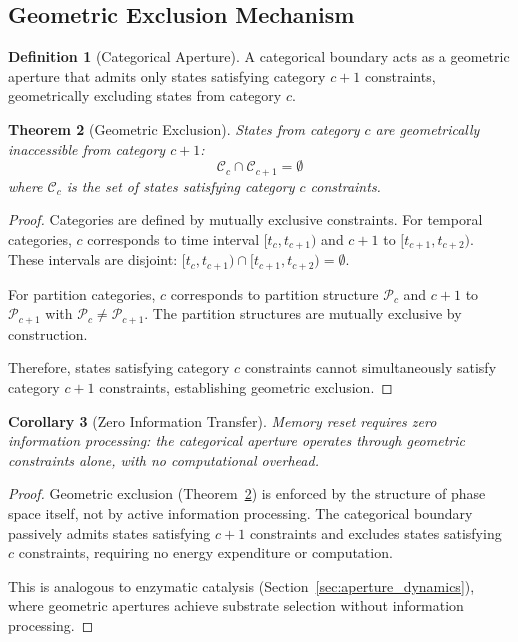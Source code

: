 \documentclass[11pt,twocolumn,a4paper]{article}
\newtheorem{theorem}{Theorem}[section]
\newtheorem{corollary}[theorem]{Corollary}
\theoremstyle{definition}
\newtheorem{definition}[theorem]{Definition}
\theoremstyle{remark}
\begin{document}
\subsection{Geometric Exclusion Mechanism}

\begin{definition}[Categorical Aperture]
\label{def:categorical_aperture}
A categorical boundary acts as a geometric aperture that admits only states satisfying category $c+1$ constraints, geometrically excluding states from category $c$.
\end{definition}

\begin{theorem}[Geometric Exclusion]
\label{thm:geometric_exclusion}
States from category $c$ are geometrically inaccessible from category $c+1$:
\begin{equation}
\mathcal{C}_c \cap \mathcal{C}_{c+1} = \emptyset
\label{eq:geometric_exclusion}
\end{equation}
where $\mathcal{C}_c$ is the set of states satisfying category $c$ constraints.
\end{theorem}

\begin{proof}
Categories are defined by mutually exclusive constraints. For temporal categories, $c$ corresponds to time interval $[t_c, t_{c+1})$ and $c+1$ to $[t_{c+1}, t_{c+2})$. These intervals are disjoint: $[t_c, t_{c+1}) \cap [t_{c+1}, t_{c+2}) = \emptyset$.

For partition categories, $c$ corresponds to partition structure $\mathcal{P}_c$ and $c+1$ to $\mathcal{P}_{c+1}$ with $\mathcal{P}_c \neq \mathcal{P}_{c+1}$. The partition structures are mutually exclusive by construction.

Therefore, states satisfying category $c$ constraints cannot simultaneously satisfy category $c+1$ constraints, establishing geometric exclusion.
\end{proof}

\begin{corollary}[Zero Information Transfer]
\label{cor:zero_information}
Memory reset requires zero information processing: the categorical aperture operates through geometric constraints alone, with no computational overhead.
\end{corollary}

\begin{proof}
Geometric exclusion (Theorem~\ref{thm:geometric_exclusion}) is enforced by the structure of phase space itself, not by active information processing. The categorical boundary passively admits states satisfying $c+1$ constraints and excludes states satisfying $c$ constraints, requiring no energy expenditure or computation.

This is analogous to enzymatic catalysis (Section~\ref{sec:aperture_dynamics}), where geometric apertures achieve substrate selection without information processing.
\end{proof}
\end{document}
